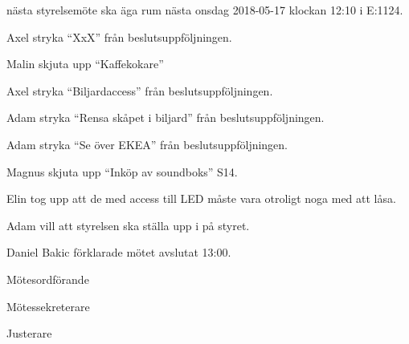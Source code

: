 \documentclass[10pt]{article}
\def\mo{Daniel Bakic}
\def\ms{Axel Voss}
\def\ji{Adam Belfrage}
\begin{document}
\begin{paragrafer}
    \Mba nästa styrelsemöte ska äga rum nästa onsdag 2018-05-17 klockan 12:10 i E:1124.



    Axel \ypa stryka ``XxX'' från beslutsuppföljningen. 

    \Mbaby 

    Malin \ypa skjuta upp ``Kaffekokare''

    \Mbaby 

    Axel \ypa stryka ``Biljardaccess'' från beslutsuppföljningen.

    \Mbaby 

    Adam \ypa stryka ``Rensa skåpet i biljard'' från beslutsuppföljningen.

    \Mbaby 

    Adam \ypa stryka ``Se över EKEA'' från beslutsuppföljningen.

    \Mbaby 

    Magnus \ypa skjuta upp ``Inköp av soundboks'' S14.

    \Mbaby 	

    Elin tog upp att de med access till LED måste vara otroligt noga med att låsa.

    Adam vill att styrelsen ska ställa upp i på styret. 


    {\mo} förklarade mötet avslutat 13:00.
\end{paragrafer}

\hidesignfoot
\begin{signatures}{3}
    \signature{\mo}{Mötesordförande}
    \signature{\ms}{Mötessekreterare}
    \signature{\ji}{Justerare}
\end{signatures}
\end{document}
